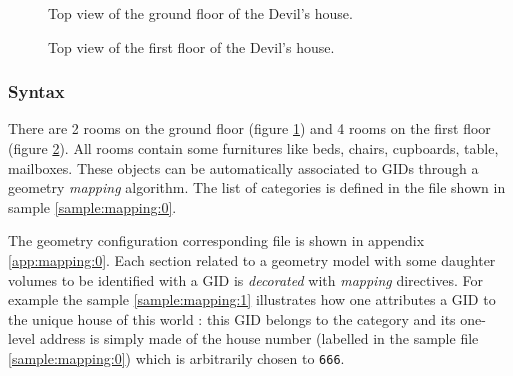 \begin{figure}[h]
\begin{center}
\end{center}
\caption{Top   view    of   the   ground   floor    of   the   Devil's
  house.}\label{fig:mapping:1}
\end{figure}

\begin{figure}[h]
\begin{center}
\end{center}
\caption{Top   view    of   the    first   floor   of    the   Devil's
  house.}\label{fig:mapping:2}
\end{figure}
\clearpage
\subsubsection{Syntax}

\begin{sample}
\caption{The   geometry  categories   in  the   \textit{Devil's  house
    world}. Note  that the categories  are introduced from the  top of
  the hierarchy to the final leaves.}
\label{sample:mapping:0}
\end{sample}

There are 2 rooms on the ground floor (figure \ref{fig:mapping:1}) and
4 rooms  on the first  floor (figure \ref{fig:mapping:2}).   All rooms
contain   some  furnitures  like   beds,  chairs,   cupboards,  table,
mailboxes. These objects can be automatically associated to GIDs
through a geometry \emph{mapping} algorithm.  The
list  of  categories   is  defined  in  the  file   shown  in  sample
\ref{sample:mapping:0}.

The  geometry configuration  corresponding file  is shown  in appendix
\ref{app:mapping:0}.  Each  section related  to a geometry  model with
some daughter volumes to be  identified with a GID is \emph{decorated}
with    \emph{mapping}   directives.    For    example   the    sample
\ref{sample:mapping:1}  illustrates how  one attributes  a GID  to the
unique  house of  this  world :  this  GID belongs  to the  
category and its one-level address  is simply made of the house number
(labelled  in the sample file \ref{sample:mapping:0}) which
is arbitrarily chosen to \texttt{666}.


